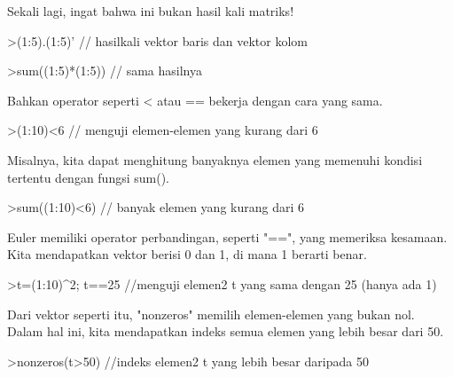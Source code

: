 \documentclass[a4paper,10pt]{article}
\begin{document}
\begin{eulernotebook}
\begin{euleroutput}
  Sekali lagi, ingat bahwa ini bukan hasil kali matriks!
  
\end{euleroutput}
\begin{eulerprompt}
>(1:5).(1:5)' // hasilkali vektor baris dan vektor kolom
\end{eulerprompt}
\begin{euleroutput}
  
\end{euleroutput}
\begin{eulerprompt}
>sum((1:5)*(1:5)) // sama hasilnya
\end{eulerprompt}
\begin{euleroutput}
  
  Bahkan operator seperti < atau == bekerja dengan cara yang sama.
  
\end{euleroutput}
\begin{eulerprompt}
>(1:10)<6 // menguji elemen-elemen yang kurang dari 6
\end{eulerprompt}
\begin{euleroutput}
  
  Misalnya, kita dapat menghitung banyaknya elemen yang memenuhi kondisi tertentu dengan fungsi sum().
  
\end{euleroutput}
\begin{eulerprompt}
>sum((1:10)<6) // banyak elemen yang kurang dari 6
\end{eulerprompt}
\begin{euleroutput}
  
  Euler memiliki operator perbandingan, seperti "==", yang memeriksa kesamaan. Kita mendapatkan vektor berisi 0 dan 1, di mana 1 berarti benar.
  
\end{euleroutput}
\begin{eulerprompt}
>t=(1:10)^2; t==25 //menguji elemen2 t yang sama dengan 25 (hanya ada 1)
\end{eulerprompt}
\begin{euleroutput}
  
  Dari vektor seperti itu, "nonzeros" memilih elemen-elemen yang bukan nol. Dalam hal ini, kita mendapatkan indeks semua elemen yang lebih besar dari 50.
  
\end{euleroutput}
\begin{eulerprompt}
>nonzeros(t>50) //indeks elemen2 t yang lebih besar daripada 50
\end{eulerprompt}
\begin{euleroutput}
  

\end{euleroutput}
\end{eulernotebook}
\end{document}
